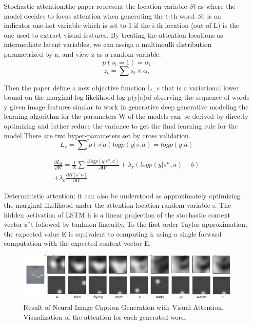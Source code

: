 \documentclass[xelatex,a4j,10pt,twocolumn]{article}
\begin{document}
Stochastic attention:the paper represent the location variable \textit{St} as where the model decides to focus attention when generating the t-th word. St is an indicator one-hot variable which is set to 1 if the i-th location (out of L) is the one used to extract visual features. By treating the attention locations as intermediate latent variables, we can assign a multinoulli distribution parametrized by a, and view z as a random variable: 
\begin{equation}
    p(s_t = 1)= \alpha_t
\end{equation}
\begin{equation}
    z_t = \sum s_t\times\alpha_i
\end{equation}

Then the paper define a new objective function L\_s that is a variational lower bound on the marginal log-likelihood log p(y|a)of observing the sequence of words y given image features
similar to work in generative deep generative modeling the learning algorithm for the parameters W of the models can be derived by directly optimizing and futher  reduce the variance to get the final learning rule for the model.There are two hyper-parameters set by cross validation.
\begin{equation}
    L_s = \sum p(s|a)logp(y|s,a)
        = log p(y|a)
\end{equation}

\begin{equation}
\begin{split}
    \frac{\partial L_S}{\partial W} = \frac{1}{N}\sum\frac{\partial log p(y|s^n,a)}{\partial W}+\lambda_r(log p (y|s^n,a)-b) \\
    + \lambda_e\frac{\partial H[s^-n]}{\partial W}    
\end{split}
\end{equation}

Deterministic attention: it can also be understood as approximately optimizing the marginal likelihood under the attention location random variable s. The hidden activation of LSTM h is a linear projection of the stochastic context vector zˆt followed by tanhnon-linearity. To the first-order Taylor approximation, the expected value E is equivalent to computing h using a single forward computation with the expected context vector E.
\begin{figure}[t]
	\centering
    \includegraphics[width=1\textwidth]{3atten.png}
 	\caption{Result of Neural Image Caption Generation with Visual Attention. Visualization of the attention for each generated word.}
 	\label{fig:3atten}
\end{figure}
\end{document}
